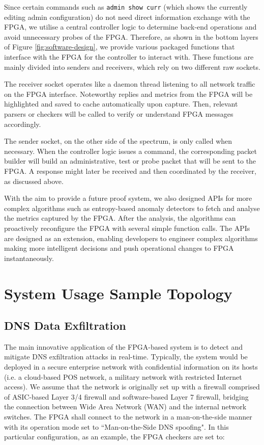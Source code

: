\documentclass[a4paper]{report}
\newcommand{\code}{\texttt}
\begin{document}
Since certain commands such as \code{admin show curr} (which shows the currently editing admin configuration) do not need direct information exchange with the FPGA, we utilise a central controller logic to determine back-end operations and avoid unnecessary probes of the FPGA. Therefore, as shown in the bottom layers of Figure \ref{fig:software-design}, we provide various packaged functions that interface with the FPGA for the controller to interact with. These functions are mainly divided into senders and receivers, which rely on two different raw sockets.

The receiver socket operates like a daemon thread listening to all network traffic on the FPGA interface. Noteworthy replies and metrics from the FPGA will be highlighted and saved to cache automatically upon capture. Then, relevant parsers or checkers will be called to verify or understand FPGA messages accordingly. 

The sender socket, on the other side of the spectrum, is only called when necessary. When the controller logic issues a command, the corresponding packet builder will build an administrative, test or probe packet that will be sent to the FPGA. A response might later be received and then coordinated by the receiver, as discussed above.

With the aim to provide a future proof system, we also designed APIs for more complex algorithms such as entropy-based anomaly detectors to fetch and analyse the metrics captured by the FPGA. After the analysis, the algorithms can proactively reconfigure the FPGA with several simple function calls. The APIs are designed as an extension, enabling developers to engineer complex algorithms making more intelligent decisions and push operational changes to FPGA instantaneously.

\section{System Usage Sample Topology}
\label{section:design-system-usage-sample}

\subsection{DNS Data Exfiltration}

The main innovative application of the FPGA-based system is to detect and mitigate DNS exfiltration attacks in real-time. Typically, the system would be deployed in a secure enterprise network with confidential information on its hosts (i.e. a cloud-based POS network, a military network with restricted Internet access). We assume that the network is originally set up with a firewall comprised of ASIC-based Layer 3/4 firewall and software-based Layer 7 firewall, bridging the connection between Wide Area Network (WAN) and the internal network switches. The FPGA shall connect to the network in a man-on-the-side manner with its operation mode set to ``Man-on-the-Side DNS spoofing".  In this particular configuration, as an example, the FPGA checkers are set to:
\end{document}
